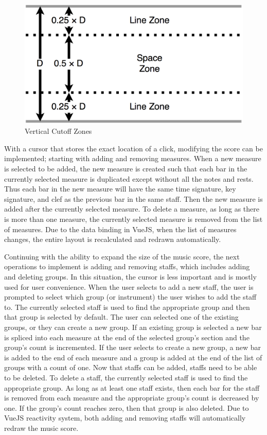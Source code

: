 \documentclass[letterpaper,12pt]{article}
\begin{document}
\begin{figure}[H]
    \begin{center}
        \includegraphics[scale=0.2]{imgs/vert-cutoff.png}
    \end{center}
    \caption{Vertical Cutoff Zones}
    \label{fig:vert-cutoff}
\end{figure}

With a cursor that stores the exact location of a click, modifying the score can be implemented; starting with adding
and removing measures. When a new measure is selected to be added, the new measure is created such that each bar in the
currently selected measure is duplicated except without all the notes and rests. Thus each bar in the new measure will
have the same time signature, key signature, and clef as the previous bar in the same staff. Then the new measure is
added after the currently selected measure. To delete a measure, as long as there is more than one measure, the
currently selected measure is removed from the list of measures. Due to the data binding in VueJS, when the list of
measures changes, the entire layout is recalculated and redrawn automatically.

Continuing with the ability to expand the size of the music score, the next operations to implement is adding and
removing staffs, which includes adding and deleting groups. In this situation, the cursor is less important and is
mostly used for user convenience. When the user selects to add a new staff, the user is prompted to select which group
(or instrument) the user wishes to add the staff to. The currently selected staff is used to find the appropriate group
and then that group is selected by default. The user can selected one of the existing groups, or they can create a new
group. If an existing group is selected a new bar is spliced into each measure at the end of the selected group's
section and the group's count is incremented. If the user selects to create a new group, a new bar is added to the end
of each measure and a group is added at the end of the list of groups with a count of one. Now that staffs can be added,
staffs need to be able to be deleted. To delete a staff, the currently selected staff is used to find the appropriate
group. As long as at least one staff exists, then each bar for the staff is removed from each measure and the
appropriate group's count is decreased by one. If the group's count reaches zero, then that group is also deleted. Due
to VueJS reactivity system, both adding and removing staffs will automatically redraw the music score.
\end{document}
